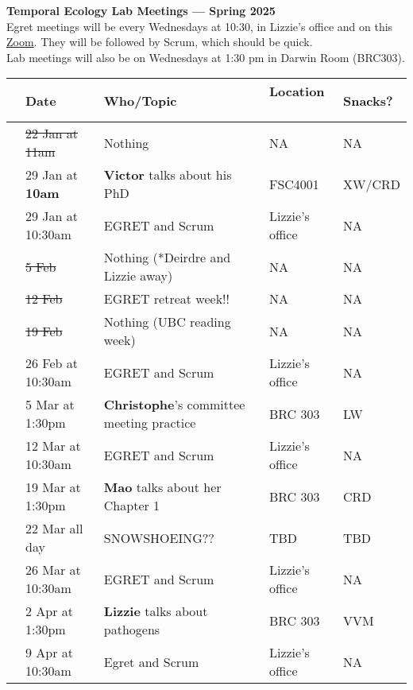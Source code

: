 \documentclass[11pt]{article}
\begin{document}
 
\raggedright
{}

\begin{center} 
{\large \textbf{Temporal Ecology Lab Meetings --- Spring 2025}} \\ [2pt]
Egret meetings will be every Wednesdays at 10:30, in Lizzie's office and on this  \href{https://ubc.zoom.us/j/61453894591?pwd=b2U5MTmUXtOCTKFlBW1s3pBMvHYWP9.1}{Zoom}. They will be followed by Scrum, which should be quick. 
\\ Lab meetings will also be on Wednesdays at 1:30 pm in Darwin Room (BRC303).\\ %
\end{center} 

\begin{center}
\begin{tabular}{ p{0.2 cm}  p{3.2 cm}  p{6 cm}  p{4 cm} p{1.5 cm} }  \hline \hline
 & \textbf{Date}
   & \textbf{Who/Topic}
      & \textbf{Location}  \
            & \textbf{Snacks?}  \\ 
\hline \hline
&\sout{22 Jan at 11am}& Nothing  & NA & NA \\\hline
&29 Jan at \textbf{10am} & \textbf{Victor} talks about his PhD & FSC4001 & XW/CRD \\\hline
&29 Jan at 10:30am & EGRET and Scrum & Lizzie's office & NA \\\hline
&\sout{5 Feb} & Nothing (*Deirdre and Lizzie away) &NA&NA\\\hline
&\sout{12 Feb} & EGRET retreat week!! & NA &NA \\\hline
&\sout{19 Feb} & Nothing (UBC reading week) &NA& NA \\\hline
&26 Feb at 10:30am & EGRET and Scrum & Lizzie's office & NA \\\hline
&5 Mar at 1:30pm & \textbf{Christophe}'s committee meeting practice  & BRC 303 & LW \\\hline
&12 Mar at 10:30am & EGRET and Scrum& Lizzie's office  &NA \\\hline
&19 Mar at 1:30pm & \textbf{Mao} talks about her Chapter  1 & BRC 303 &  CRD \\\hline
&22 Mar all day & SNOWSHOEING?? & TBD & TBD  \\\hline
&26 Mar at 10:30am & EGRET and Scrum& Lizzie's office  & NA \\\hline
&2 Apr at 1:30pm & \textbf{Lizzie} talks about pathogens & BRC 303 & VVM \\\hline
&9 Apr at 10:30am & Egret and Scrum & Lizzie's office & NA \\\hline
\end{tabular}
\end{center}
\end{document}
